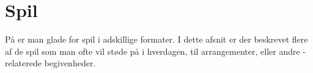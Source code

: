 \section{Spil}
På \TKET er man glade for spil i adskillige formater. I dette afsnit er der beskrevet flere af de spil som man ofte vil støde på i hverdagen, til arrangementer, eller andre \TK-relaterede begivenheder.








\newpage

